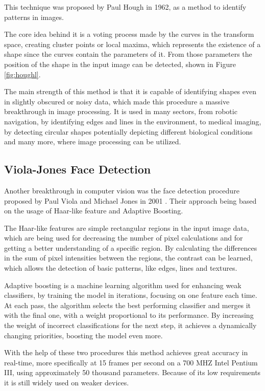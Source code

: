 \par This technique was proposed by Paul Hough in 1962, as a method to identify patterns in images. \cite{Duda1972}
\par The core idea behind it is a voting process made by the curves in the transform space, creating cluster points or local maxima, which represents the existence of a shape since the curves contain the parameters of it. From those parameters the position of the shape in the input image can be detected, shown in Figure \ref{fig:houghl}.
\par The main strength of this method is that it is capable of identifying shapes even in slightly obscured or noisy data, which made this procedure a massive breakthrough in image processing. It is used in many sectors, from robotic navigation, by identifying edges and lines in the environment, to medical imaging, by detecting circular shapes potentially depicting different biological conditions and many more, where image processing can be utilized.

\subsection{Viola-Jones Face Detection}
\label{subsec:relatedsec1subsec2}
\par Another breakthrough in computer vision was the face detection procedure proposed by Paul Viola and Michael Jones in 2001 \cite{viola2001}. Their approach being based on the usage of Haar-like feature and Adaptive Boosting.
\par The Haar-like features are simple rectangular regions in the input image data, which are being used for decreasing the number of pixel calculations and for getting a better understanding of a specific region. By calculating the differences in the sum of pixel intensities between the regions, the contrast can be learned, which allows the detection of basic patterns, like edges, lines and textures.
\par Adaptive boosting is a machine learning algorithm used for enhancing weak classifiers, by training the model in iterations, focusing on one feature each time. At each pass, the algorithm selects the best performing classifier and merges it with the final one, with a weight proportional to its performance. By increasing the weight of incorrect classifications for the next step, it achieves a dynamically changing priorities, boosting the model even more.
\par With the help of these two procedures this method achieves great accuracy in real-time, more specifically at 15 frames per second on a 700 MHZ Intel Pentium III, using approximately 50 thousand parameters. Because of its low requirements it is still widely used on weaker devices.

